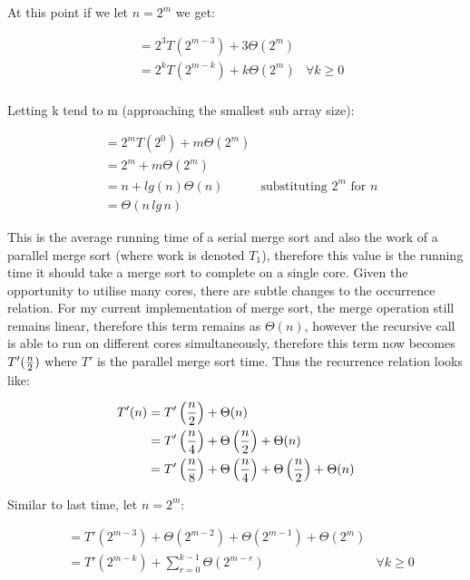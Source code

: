 \documentclass[12pt,twoside,notitlepage]{report}
\begin{document}
At this point if we let $n = 2^{m}$ we get:

\begin{align*}
&= 2^{3}T\left(2^{m-3}\right) + 3\Theta\left(2^{m}\right) \\
&= 2^{k}T\left(2^{m-k}\right) + k\Theta\left(2^{m}\right) & \forall k \geq 0\\
\end{align*}

Letting k tend to m (approaching the smallest sub array size):

\begin{align*}
&= 2^{m}T\left(2^{0}\right) + m\Theta\left(2^{m}\right) \\
&= 2^{m} + m\Theta\left(2^{m}\right) \\
&= n + lg(n)\Theta(n) & \text{substituting $2^{m}$ for $n$} \\
&= \Theta(n\,{lg\,{n}}) 
\end{align*}

This is the average running time of a serial merge sort and also the work of a parallel merge sort (where work is denoted $T_1$), therefore this value is the running time it should take a merge sort to complete on a single core. Given
the opportunity to utilise many cores, there are subtle changes to the occurrence relation. For my current implementation of merge sort, the merge operation still remains linear, therefore this term remains as $\Theta(n)$, however the
recursive call is able to run on different cores simultaneously, therefore this term now becomes $T'({n \over 2})$ where $T'$ is the parallel merge sort time. Thus the recurrence relation looks like:

\begin{align*}
T'(n) &= T'\left({n \over 2}\right) + \Theta(n) \\
&= T'\left({n \over 4}\right) + \Theta\left({n \over 2}\right) + \Theta(n) \\
&= T'\left({n \over 8}\right) + \Theta\left({n \over 4}\right) + \Theta\left({n \over 2}\right) + \Theta(n) \\
\end{align*}

Similar to last time, let $n = 2^{m}$:

\begin{align*}
&= T'\left(2^{m-3}\right) + \Theta\left(2^{m-2}\right) + \Theta\left(2^{m-1}\right) + \Theta(2^{m}) \\
&= T'\left(2^{m-k}\right) + \sum_{r=0}^{k-1} \Theta\left(2^{m-r}\right) & \forall k \geq 0 \\
\end{align*}
\end{document}
